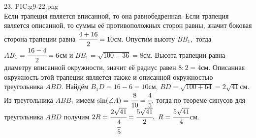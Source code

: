23. {{PIC:g9-22.png}}\\
Если трапеция является вписанной, то она равнобедренная. Если трапеция является описанной, то суммы её противоположных сторон равны, значит боковая сторона трапеции равна $\cfrac{4+16}{2}=10$см. Опустим высоту $BB_1,$ тогда $AB_1=\cfrac{16-4}{2}=6$см и $BB_1=\sqrt{100-36}=8$см. Высота трапеции равна диаметру вписанной окружности, значит её радиус равен $8:2=4$см. Описанная окружность этой трапеции является также и описанной окружностью треугольника $ABD.$ Найдём $B_1D=16-6=10$см, $BD=\sqrt{100+64}=2\sqrt{41}$см. Из треугольника $ABB_1$ имеем $\sin(\angle A)=\cfrac{8}{10}=\cfrac{4}{5},$ тогда по теореме синусов для треугольника $ABD$ получим $2R=\cfrac{2\sqrt{41}}{\cfrac{4}{5}}=\cfrac{5\sqrt{41}}{2},\ R=\cfrac{5\sqrt{41}}{4}$см.\\
